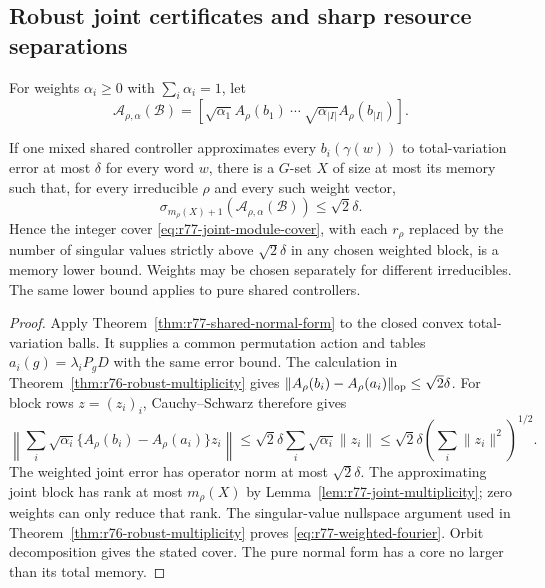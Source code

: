 \subsection{Robust joint certificates and sharp resource separations}
For weights $\alpha_i\ge0$ with $\sum_i\alpha_i=1$, let
\[
 \mathcal A_{\rho,\alpha}(\mathcal B)
   =[\sqrt{\alpha_1}A_\rho(b_1)\ \cdots\
                       \sqrt{\alpha_{|I|}}A_\rho(b_{|I|})].
\]

\begin{theorem}
\label{thm:r77-joint-robust}
If one mixed shared controller approximates every $b_i(\gamma(w))$
to total-variation error at most $\delta$ for every word $w$, there
is a $G$-set $X$ of size at most its memory such that, for every
irreducible $\rho$ and every such weight vector,
\begin{equation}\label{eq:r77-weighted-fourier}
 \sigma_{m_\rho(X)+1}
       (\mathcal A_{\rho,\alpha}(\mathcal B))\le\sqrt2\delta.
\end{equation}
Hence the integer cover \eqref{eq:r77-joint-module-cover}, with each
$r_\rho$ replaced by the number of singular values strictly above
$\sqrt2\delta$ in any chosen weighted block, is a memory lower bound.
Weights may be chosen separately for different irreducibles.
The same lower bound applies to pure shared controllers.
\end{theorem}
\begin{proof}
Apply Theorem~\ref{thm:r77-shared-normal-form} to the closed convex
total-variation balls.  It supplies a common permutation action and
tables $a_i(g)=\lambda_iP_gD$ with the same error bound.  The calculation
in Theorem~\ref{thm:r76-robust-multiplicity} gives
$\|A_\rho(b_i)-A_\rho(a_i)\|_{\rm op}\le\sqrt2\delta$.
For block rows $z=(z_i)_i$, Cauchy--Schwarz therefore gives
\[
 \left\|\sum_i\sqrt{\alpha_i}
       \{A_\rho(b_i)-A_\rho(a_i)\}z_i\right\|
 \le\sqrt2\delta\sum_i\sqrt{\alpha_i}\|z_i\|
 \le\sqrt2\delta\left(\sum_i\|z_i\|^2\right)^{1/2}.
\]
The weighted joint error has operator norm at most $\sqrt2\delta$.
The approximating joint block has rank at most $m_\rho(X)$ by
Lemma~\ref{lem:r77-joint-multiplicity}; zero weights can only reduce
that rank.  The singular-value nullspace argument used in
Theorem~\ref{thm:r76-robust-multiplicity} proves
\eqref{eq:r77-weighted-fourier}.  Orbit decomposition gives the stated
cover.  The pure normal form has a core no larger than its total memory.
\end{proof}


